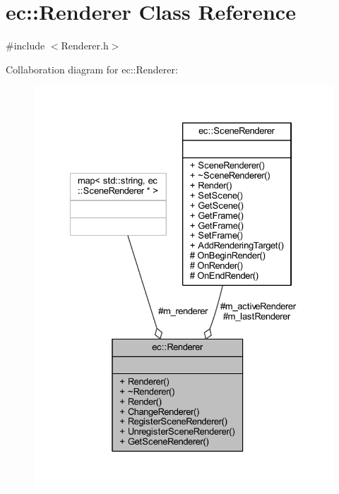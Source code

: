 \hypertarget{classec_1_1_renderer}{}\section{ec\+:\+:Renderer Class Reference}
\label{classec_1_1_renderer}


{\ttfamily \#include $<$Renderer.\+h$>$}



Collaboration diagram for ec\+:\+:Renderer\+:\nopagebreak
\begin{figure}[H]
\begin{center}
\leavevmode
\includegraphics[width=328pt]{classec_1_1_renderer__coll__graph}
\end{center}
\end{figure}
